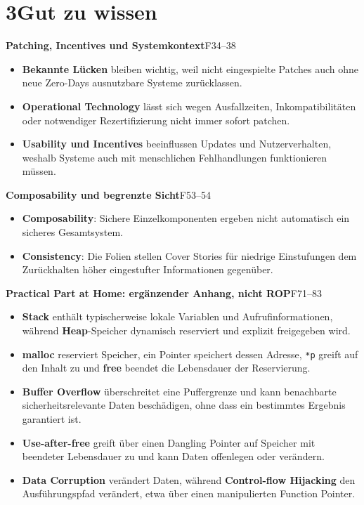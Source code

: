 \documentclass[11pt,a4paper]{article}
\newcommand{\block}[2]{\par\vspace{5pt}\textbf{#1}\hfill{\scriptsize #2}\par\nopagebreak}
\begin{document}
\section*{3\quad Gut zu wissen}
\block{Patching, Incentives und Systemkontext}{F34--38}
\begin{itemize}
\item \textbf{Bekannte Lücken} bleiben wichtig, weil nicht eingespielte Patches auch ohne neue Zero-Days ausnutzbare Systeme zurücklassen.
\item \textbf{Operational Technology} lässt sich wegen Ausfallzeiten, Inkompatibilitäten oder notwendiger Rezertifizierung nicht immer sofort patchen.
\item \textbf{Usability und Incentives} beeinflussen Updates und Nutzerverhalten, weshalb Systeme auch mit menschlichen Fehlhandlungen funktionieren müssen.
\end{itemize}
\block{Composability und begrenzte Sicht}{F53--54}
\begin{itemize}
\item \textbf{Composability}: Sichere Einzelkomponenten ergeben nicht automatisch ein sicheres Gesamtsystem.
\item \textbf{Consistency}: Die Folien stellen Cover Stories für niedrige Einstufungen dem Zurückhalten höher eingestufter Informationen gegenüber.
\end{itemize}
\block{Practical Part at Home: ergänzender Anhang, nicht ROP}{F71--83}
\begin{itemize}
\item \textbf{Stack} enthält typischerweise lokale Variablen und Aufrufinformationen, während \textbf{Heap}-Speicher dynamisch reserviert und explizit freigegeben wird.
\item \textbf{malloc} reserviert Speicher, ein Pointer speichert dessen Adresse, \texttt{*p} greift auf den Inhalt zu und \textbf{free} beendet die Lebensdauer der Reservierung.
\item \textbf{Buffer Overflow} überschreitet eine Puffergrenze und kann benachbarte sicherheitsrelevante Daten beschädigen, ohne dass ein bestimmtes Ergebnis garantiert ist.
\item \textbf{Use-after-free} greift über einen Dangling Pointer auf Speicher mit beendeter Lebensdauer zu und kann Daten offenlegen oder verändern.
\item \textbf{Data Corruption} verändert Daten, während \textbf{Control-flow Hijacking} den Ausführungspfad verändert, etwa über einen manipulierten Function Pointer.
\end{itemize}
\end{document}
